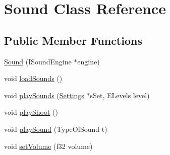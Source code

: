 \hypertarget{class_sound}{
\section{Sound Class Reference}
\label{class_sound}
}
\subsection*{Public Member Functions}
\begin{DoxyCompactItemize}
\item 
\hyperlink{class_sound_a9f9260c6c6e41f13ee2f960f2968fd92}{Sound} (ISoundEngine $\ast$engine)
\item 
void \hyperlink{class_sound_a546cbcbe1daf58877604aed9ec020b3e}{loadSounds} ()
\item 
void \hyperlink{class_sound_a73e9a5469bd02743280cbc139e02a26c}{playSounds} (\hyperlink{struct_settings}{Settings} $\ast$sSet, ELevels level)
\item 
void \hyperlink{class_sound_a4cb3a0ff7fb89b3267cc1d0e7abec829}{playShoot} ()
\item 
void \hyperlink{class_sound_a8827c2786f9323a93a250ab9872a7d87}{playSound} (TypeOfSound t)
\item 
void \hyperlink{class_sound_a214b10b071c25751d4676880e5ce824d}{setVolume} (f32 volume)
\end{DoxyCompactItemize}
